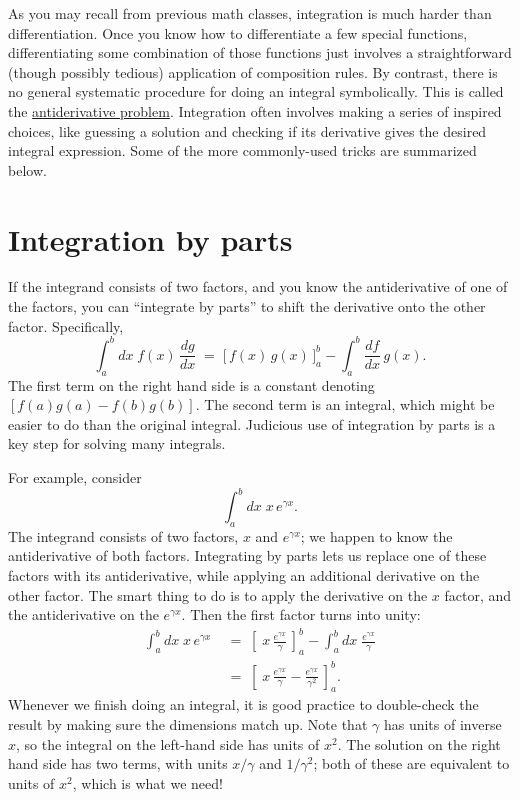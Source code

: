 \documentclass[10pt,a4paper]{article}
\begin{document}
As you may recall from previous math classes, integration is much
harder than differentiation. Once you know how to differentiate a few
special functions, differentiating some combination of those functions
just involves a straightforward (though possibly tedious) application
of composition rules. By contrast, there is no general systematic
procedure for doing an integral symbolically. This is called the
\href{http://en.wikipedia.org/wiki/Antiderivative}{antiderivative
  problem}. Integration often involves making a series of inspired
choices, like guessing a solution and checking if its derivative gives
the desired integral expression. Some of the more commonly-used tricks
are summarized below.

\section{Integration by parts}

If the integrand consists of two factors, and you know the
antiderivative of one of the factors, you can ``integrate by parts''
to shift the derivative onto the other factor. Specifically,
\begin{equation}
  \int_a^b dx \; f(x) \, \frac{dg}{dx} \;=\; \Big[\,f(x)\,
    g(x)\,\Big]_a^b - \int_a^b \frac{df}{dx}\, g(x).
\end{equation}
The first term on the right hand side is a constant denoting
$[f(a)g(a) - f(b)g(b)]$. The second term is an integral, which might
be easier to do than the original integral. Judicious use of integration
by parts is a key step for solving many integrals.

For example, consider
\begin{equation}
  \int_a^b dx\; x \, e^{\gamma x}.
\end{equation}
The integrand consists of two factors, $x$ and $e^{\gamma x}$; we
happen to know the antiderivative of both factors. Integrating by
parts lets us replace one of these factors with its antiderivative,
while applying an additional derivative on the other factor. The smart
thing to do is to apply the derivative on the $x$ factor, and the
antiderivative on the $e^{\gamma x}$.  Then the first factor turns
into unity:
\begin{align}
  \int_a^b dx\; x\, e^{\gamma x} \;&=\; \left[\;x\, \frac{e^{\gamma x}}{\gamma}\, \right]_a^b - \int_a^b dx\; \frac{e^{\gamma x}}{\gamma} \\
  &=\; \left[\;x\, \frac{e^{\gamma x}}{\gamma} - \frac{e^{\gamma x}}{\gamma^2} \,\right]_a^b.
\end{align}
Whenever we finish doing an integral, it is good practice to
double-check the result by making sure the dimensions match up. Note
that $\gamma$ has units of inverse $x$, so the integral on the
left-hand side has units of $x^2$. The solution on the right hand side
has two terms, with units $x/\gamma$ and $1/\gamma^2$; both of these
are equivalent to units of $x^2$, which is what we need!
\end{document}
